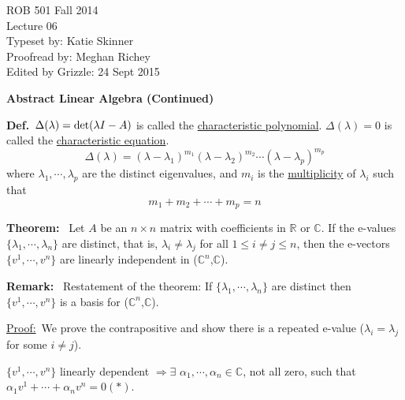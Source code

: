 \documentclass[letterpaper]{article}
\begin{document}
\baselineskip=48pt  %


\setlength{\parskip}{.3in}
\setlength{\itemsep}{.3in}

\pagestyle{plain}

{\Large \bf
\begin{center}
ROB 501 Fall 2014 \\
Lecture 06 \\
Typeset by: Katie Skinner \\
Proofread by: Meghan Richey \\
Edited by Grizzle: 24 Sept 2015

\end{center}
}



\Large

\begin{center}
\textbf{Abstract Linear Algebra (Continued)}
\end{center}

\noindent \textbf{Def.}~$ \Delta (\lambda) = \textnormal{det}(\lambda I - A) $ is called the \underline{characteristic polynomial}. $ \Delta (\lambda) = 0$ is called the \underline{characteristic equation}.  $$ \Delta (\lambda) = (\lambda - \lambda_1)^{m_1}(\lambda - \lambda_2)^{m_2}\dotsb(\lambda - \lambda_p)^{m_p} $$
\noindent where $\lambda_1, \dotsb, \lambda_p$ are the distinct eigenvalues, and $m_i$ is the \underline{multiplicity} of $\lambda_i$ such that $$ m_1 + m_2 + \dotsb + m_p = n$$

\noindent \textbf{Theorem:}~ Let $A$ be an $n \times n$ matrix with coefficients in $\mathbb{R}$ or $\mathbb{C}$. If the e-values $\{ \lambda_1,\dotsb, \lambda_n \}$ are distinct, that is, $\lambda_i \neq \lambda_j $ for all $1 \le i \neq j \le n$, then the e-vectors $\{ v^1,\dotsb,v^n \}$ are linearly independent in ($\mathbb{C}^n$,$\mathbb{C}$).

\noindent \textbf{Remark:}~ Restatement of the theorem: If $\{ \lambda_1,\dotsb,\lambda_n \}$ are distinct then $\{ v^1,\dotsb,v^n \}$ is a basis for ($\mathbb{C}^n$,$\mathbb{C}$).

\underline{Proof:}~We prove the contrapositive and show there is a repeated e-value ($\lambda_i = \lambda_j$ for some $ i \neq j$).

    $\{ v^1,\dotsb,v^n \}$ linearly dependent $\Rightarrow \exists$  $\alpha_1,\dotsb,\alpha_n \in \mathbb{C}$, not all zero, such that $ \alpha_1 v^1 + \dotsb + \alpha_n v^n = 0(*)$.
\end{document}
